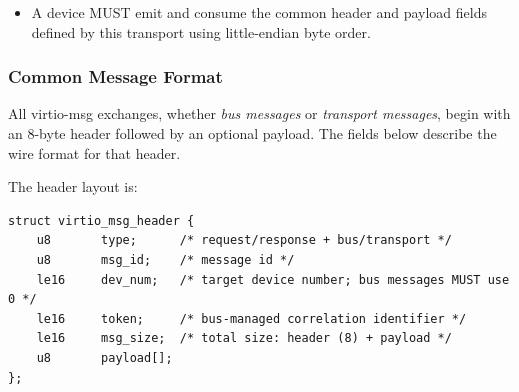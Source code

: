 \begin{itemize}
  \item A device MUST emit and consume the common header and payload fields
        defined by this transport using little-endian byte order.
\end{itemize}

\subsubsection{Common Message Format}
\label{sec:Virtio Transport Options / Virtio Over Messages / Basic Concepts / Common Message Format}

All virtio-msg exchanges, whether \emph{bus messages} or \emph{transport
messages}, begin with an 8-byte header followed by an optional payload. The
fields below describe the wire format for that header.

The header layout is:
\begin{lstlisting}
struct virtio_msg_header {
    u8       type;      /* request/response + bus/transport */
    u8       msg_id;    /* message id */
    le16     dev_num;   /* target device number; bus messages MUST use 0 */
    le16     token;     /* bus-managed correlation identifier */
    le16     msg_size;  /* total size: header (8) + payload */
    u8       payload[];
};
\end{lstlisting}

